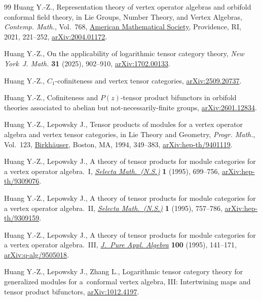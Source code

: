 \begin{thebibliography}{99}
Huang Y.-Z., Representation theory of vertex operator algebras and orbifold
 conformal field theory, in Lie {G}roups, {N}umber {T}heory, and {V}ertex
 {A}lgebras, \textit{Contemp. Math.}, Vol.~768,
 \href{https://doi.org/10.1090/conm/768/15466}{American Mathematical Society},
 Providence, RI, 2021, 221--252,
 \href{https://arxiv.org/abs/2004.01172}{arXiv:2004.01172}.

Huang Y.-Z., On the applicability of logarithmic tensor category theory,
 \textit{New York~J. Math.} \textbf{31} (2025), 902--910,
 \href{https://arxiv.org/abs/1702.00133}{arXiv:1702.00133}.

Huang Y.-Z., $C_1$-cofiniteness and vertex tensor categories,
 \href{https://arxiv.org/abs/2509.20737}{arXiv:2509.20737}.

Huang Y.-Z., Cofiniteness and {$P(z)$}-tensor product bifunctors in orbifold
 theories associated to abelian but not-necessarily-finite groups,
 \href{https://arxiv.org/abs/2601.12834}{arXiv:2601.12834}.

Huang Y.-Z., Lepowsky J., Tensor products of modules for a vertex operator
 algebra and vertex tensor categories, in Lie {T}heory and {G}eometry,
 \textit{Progr. Math.}, Vol.~123,
 \href{https://doi.org/10.1007/978-1-4612-0261-5_13}{Birkh\"auser}, Boston,
 MA, 1994, 349--383,
 \href{https://arxiv.org/abs/hep-th/9401119}{arXiv:hep-th/9401119}.

Huang Y.-Z., Lepowsky J., A theory of tensor products for module categories for
 a vertex operator algebra.~{I},
 \href{https://doi.org/10.1007/BF01587908}{\textit{Selecta Math.~(N.S.)}}
 \textbf{1} (1995), 699--756,
 \href{https://arxiv.org/abs/hep-th/9309076}{arXiv:hep-th/9309076}.

Huang Y.-Z., Lepowsky J., A theory of tensor products for module categories for
 a vertex operator algebra.~{II},
 \href{https://doi.org/10.1007/BF01587908}{\textit{Selecta Math.~(N.S.)}}
 \textbf{1} (1995), 757--786,
 \href{https://arxiv.org/abs/hep-th/9309159}{arXiv:hep-th/9309159}.

Huang Y.-Z., Lepowsky J., A theory of tensor products for module categories for
 a vertex operator algebra.~{III},
 \href{https://doi.org/10.1016/0022-4049(95)00049-3}{\textit{J.~Pure Appl.
 Algebra}} \textbf{100} (1995), 141--171,
 \href{https://arxiv.org/abs/q-alg/9505018}{arXiv:q-alg/9505018}.

Huang Y.-Z., Lepowsky J., Zhang L., Logarithmic tensor category theory for
 generalized modules for a~conformal vertex algebra, {III}: {I}ntertwining
 maps and tensor product bifunctors,
 \href{https://arxiv.org/abs/1012.4197}{arXiv:1012.4197}.


\end{thebibliography}
